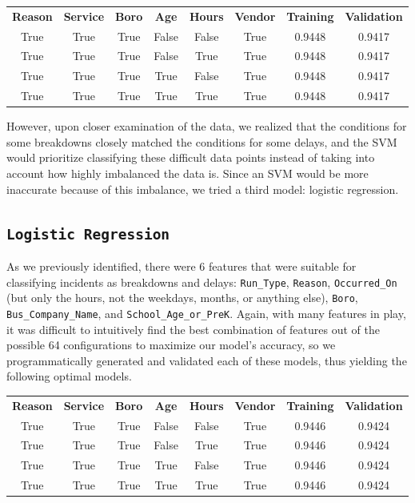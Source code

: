 \documentclass[11pt]{article}
\begin{document}
\begin{table}[h]
\centering
\begin{tabular}{cccccc|cc}
\bf{Reason} & \bf{Service} & \bf{Boro} & \bf{Age} & \bf{Hours} & \bf{Vendor}& \bf{Training} & \bf{Validation} \\
True & True & True & False & False & True & 0.9448 & 0.9417 \\
True & True & True & False & True & True & 0.9448 & 0.9417 \\
True & True & True & True & False & True & 0.9448 & 0.9417 \\
True & True & True & True & True & True & 0.9448 & 0.9417 \\
\end{tabular}
\end{table}

However, upon closer examination of the data, we realized that the conditions for some breakdowns closely matched the conditions for some delays, and the SVM would prioritize classifying these difficult data points instead of taking into account how highly imbalanced the data is. Since an SVM would be more inaccurate because of this imbalance, we tried a third model: logistic regression.

\subsection{\texttt{Logistic Regression}}
As we previously identified, there were 6 features that were suitable for classifying incidents as breakdowns and delays: \texttt{Run\_Type}, \texttt{Reason}, \texttt{Occurred\_On} (but only the hours, not the weekdays, months, or anything else), \texttt{Boro}, \texttt{Bus\_Company\_Name}, and \texttt{School\_Age\_or\_PreK}. Again, with many features in play, it was difficult to intuitively find the best combination of features out of the possible 64 configurations to maximize our model's accuracy, so we programmatically generated and validated each of these models, thus yielding the following optimal models.

\begin{table}[h]
\centering
\begin{tabular}{cccccc|cc}
\bf{Reason} & \bf{Service} & \bf{Boro} & \bf{Age} & \bf{Hours} & \bf{Vendor} & \bf{Training} & \bf{Validation} \\
True & True & True & False & False & True & 0.9446 & 0.9424 \\
True & True & True & False & True & True & 0.9446 & 0.9424 \\
True & True & True & True & False & True & 0.9446 & 0.9424 \\
True & True & True & True & True & True & 0.9446 & 0.9424 \\
\end{tabular}
\end{table}
\end{document}
